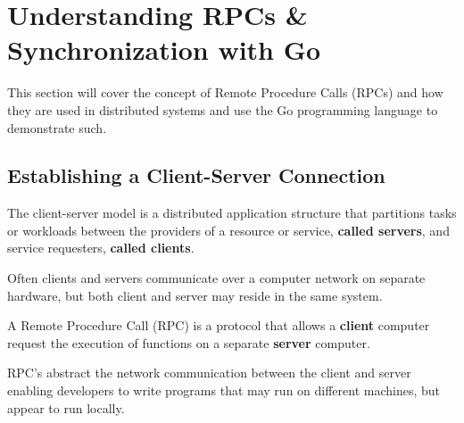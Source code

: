 \newpage 
\section{Understanding RPCs \& Synchronization with Go}
This section will cover the concept of Remote Procedure Calls (RPCs) and how they are used in distributed systems and use the Go programming language to demonstrate such.
\subsection{Establishing a Client-Server Connection}




\begin{Def}

    The client-server model is a distributed application structure that partitions tasks or workloads between the providers of a
     resource or service, \textbf{called servers}, and service requesters, \textbf{called clients}. 
     
     Often clients and servers communicate over a computer network on separate hardware, but both client and server may reside in the same system.

\end{Def}

\begin{Def}

    A Remote Procedure Call (RPC) is a protocol that allows a \textbf{client} computer request the execution of functions on a separate \textbf{server} computer.

    RPC's abstract the network communication between the client and server enabling developers to write programs that may run on different machines, but appear to run locally.
\end{Def}

